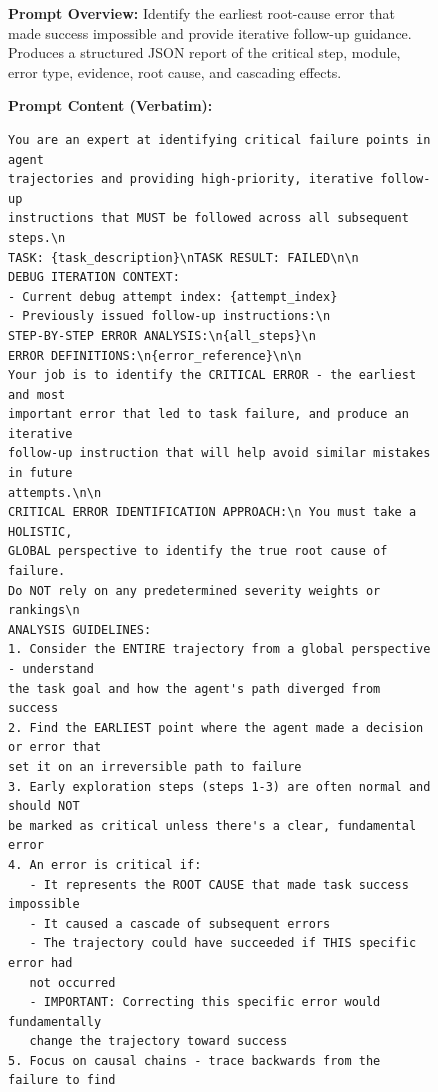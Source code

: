 \begin{figure}[htbp]
\centering
\vspace{-8mm}
\begin{tcolorbox}[
    title=\textbf{AgentDebug Prompt},
    colback=blue!1!white,
    colframe=blue!50!black,
    fonttitle=\bfseries,
]
\small

\textbf{Prompt Overview:}  
Identify the earliest root-cause error that made success impossible and provide iterative follow-up guidance. Produces a structured JSON report of the critical step, module, error type, evidence, root cause, and cascading effects.

\vspace{2mm}

\textbf{Prompt Content (Verbatim):}
\begin{verbatim}
You are an expert at identifying critical failure points in agent 
trajectories and providing high-priority, iterative follow-up 
instructions that MUST be followed across all subsequent steps.\n
TASK: {task_description}\nTASK RESULT: FAILED\n\n
DEBUG ITERATION CONTEXT:
- Current debug attempt index: {attempt_index}
- Previously issued follow-up instructions:\n
STEP-BY-STEP ERROR ANALYSIS:\n{all_steps}\n
ERROR DEFINITIONS:\n{error_reference}\n\n
Your job is to identify the CRITICAL ERROR - the earliest and most 
important error that led to task failure, and produce an iterative 
follow-up instruction that will help avoid similar mistakes in future 
attempts.\n\n
CRITICAL ERROR IDENTIFICATION APPROACH:\n You must take a HOLISTIC, 
GLOBAL perspective to identify the true root cause of failure. 
Do NOT rely on any predetermined severity weights or rankings\n
ANALYSIS GUIDELINES:
1. Consider the ENTIRE trajectory from a global perspective - understand 
the task goal and how the agent's path diverged from success
2. Find the EARLIEST point where the agent made a decision or error that 
set it on an irreversible path to failure
3. Early exploration steps (steps 1-3) are often normal and should NOT 
be marked as critical unless there's a clear, fundamental error
4. An error is critical if:
   - It represents the ROOT CAUSE that made task success impossible
   - It caused a cascade of subsequent errors
   - The trajectory could have succeeded if THIS specific error had 
   not occurred
   - IMPORTANT: Correcting this specific error would fundamentally 
   change the trajectory toward success
5. Focus on causal chains - trace backwards from the failure to find 

\end{verbatim}
\end{tcolorbox}
\end{figure}
